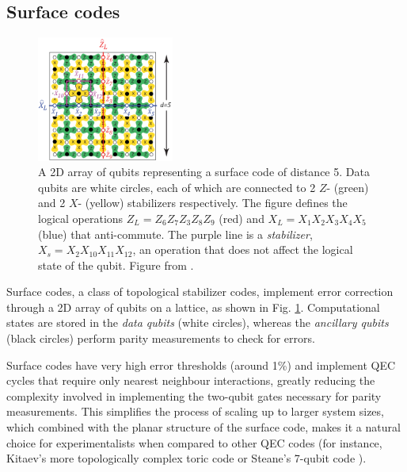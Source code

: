 \subsection{Surface codes}
\begin{figure}
  \centering
  \includegraphics[width=0.4\textwidth]{images/surface_code.png}
  \caption{A 2D array of qubits representing a surface code of distance 5. Data
    qubits are white circles, each of which are connected to 2 $Z$- (green)
    and 2 $X$- (yellow) stabilizers respectively. The figure defines the logical
    operations $Z_L = Z_6Z_7Z_3Z_8Z_9$ (red) and $X_L = X_1X_2X_3X_4X_5$ (blue)
    that anti-commute. The purple line is a \textit{stabilizer},
    $X_s = X_2 X_{10}X_{11} X_{12} $, an operation that does not affect the
    logical state of the qubit. Figure from \cite{fowler12_surfac_codes}.}
  \label{fig:surface_code}
\end{figure}

Surface codes, a class of topological stabilizer codes, implement error
correction through a 2D array of qubits on a lattice, as shown in Fig.
\ref{fig:surface_code}. Computational states are stored in the \textit{data
  qubits} (white circles), whereas the \textit{ancillary qubits} (black circles)
perform parity measurements to check for errors. 

Surface codes have very high error thresholds (around 1\%) \cite{terhal15} and
implement QEC cycles that require only nearest neighbour interactions, greatly
reducing the complexity involved in implementing the two-qubit gates necessary
for parity measurements. This simplifies the process of scaling up to larger
system sizes, which combined with the planar structure of the surface code,
makes it a natural choice for experimentalists when compared to other QEC codes
(for instance, Kitaev's more topologically complex toric code \cite{Kitaev_2003}
or Steane's 7-qubit code \cite{Steane_1996_QEC}).


